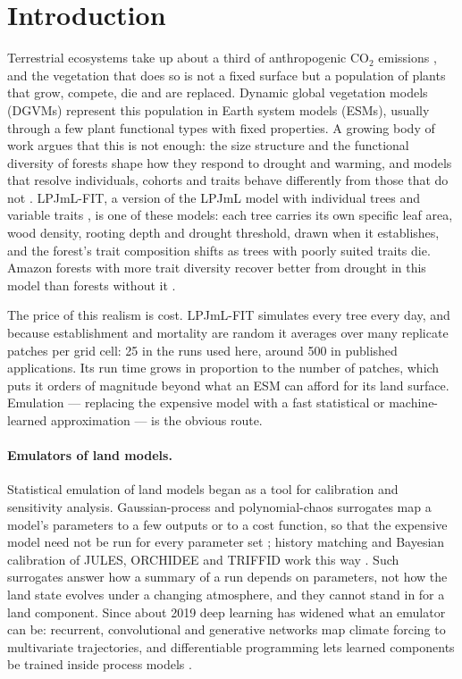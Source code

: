 \documentclass[11pt,a4paper]{article}
\begin{document}
\section{Introduction}\label{sec:intro}

Terrestrial ecosystems take up about a third of anthropogenic CO$_2$ emissions \citep{Friedlingstein2023GCB}, and
the vegetation that does so is not a fixed surface but a population of plants that grow, compete, die and are
replaced. Dynamic global vegetation models (DGVMs) represent this population in Earth system models (ESMs), usually
through a few plant functional types with fixed properties. A growing body of work argues that this is not enough:
the size structure and the functional diversity of forests shape how they respond to drought and warming, and models
that resolve individuals, cohorts and traits behave differently from those that do not \citep{Fisher2018,Fisher2020}.
LPJmL-FIT, a version of the LPJmL model with individual trees and variable traits
\citep{Sakschewski2015,Sakschewski2016,Thonicke2020}, is one of these models: each tree carries its own specific leaf
area, wood density, rooting depth and drought threshold, drawn when it establishes, and the forest's trait composition
shifts as trees with poorly suited traits die. Amazon forests with more trait diversity recover better from drought in
this model than forests without it \citep{Sakschewski2016}.

The price of this realism is cost. LPJmL-FIT simulates every tree every day, and because establishment and mortality
are random it averages over many replicate patches per grid cell: 25 in the runs used here, around 500 in published
applications. Its run time grows in proportion to the number of patches, which puts it orders of magnitude beyond what
an ESM can afford for its land surface. Emulation --- replacing the expensive model with a fast statistical or
machine-learned approximation --- is the obvious route.

\paragraph{Emulators of land models.} Statistical emulation of land models began as a tool for calibration and
sensitivity analysis. Gaussian-process and polynomial-chaos surrogates map a model's parameters to a few outputs or to
a cost function, so that the expensive model need not be run for every parameter set
\citep{R00530,R00135,R00157,R00002}; history matching and Bayesian calibration of JULES, ORCHIDEE and TRIFFID work
this way \citep{R00221,R00727,R00167}. Such surrogates answer how a summary of a run depends on parameters, not how the
land state evolves under a changing atmosphere, and they cannot stand in for a land component. Since about 2019 deep
learning has widened what an emulator can be: recurrent, convolutional and generative networks map climate forcing to
multivariate trajectories, and differentiable programming lets learned components be trained inside process models
\citep{Reichstein2019,Shen2023}.
\end{document}
